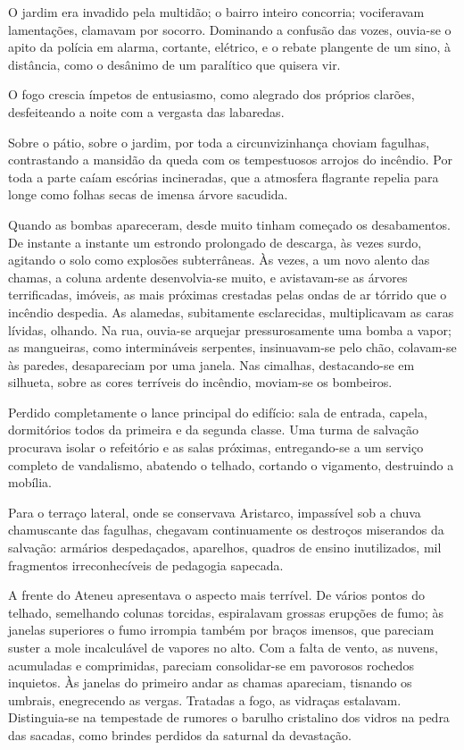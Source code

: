 O jardim era invadido pela multidão; o bairro inteiro concorria;
vociferavam lamentações, clamavam por socorro. Dominando a confusão das
vozes, ouvia{}-se o apito da polícia em alarma, cortante, elétrico, e o
rebate plangente de um sino, à distância, como o desânimo de um
paralítico que quisera vir. 

O fogo crescia ímpetos de entusiasmo, como
alegrado dos próprios clarões, desfeiteando a noite com a vergasta das
labaredas. 

Sobre o pátio, sobre o jardim, por toda a circunvizinhança
choviam fagulhas, contrastando a mansidão da queda com os tempestuosos
arrojos do incêndio. Por toda a parte caíam escórias incineradas, que a
atmosfera flagrante repelia para longe como folhas secas de imensa
árvore sacudida. 

Quando as bombas apareceram, desde muito tinham
começado os desabamentos. De instante a instante um estrondo prolongado
de descarga, às vezes surdo, agitando o solo como explosões
subterrâneas. Às vezes, a um novo alento das chamas, a coluna ardente
desenvolvia{}-se muito, e avistavam{}-se as árvores terrificadas,
imóveis, as mais próximas crestadas pelas ondas de ar tórrido que o
incêndio despedia. As alamedas, subitamente esclarecidas, multiplicavam
as caras lívidas, olhando. Na rua, ouvia{}-se arquejar pressurosamente
uma bomba a vapor; as mangueiras, como intermináveis serpentes,
insinuavam{}-se pelo chão, colavam{}-se às paredes, desapareciam por
uma janela. Nas cimalhas, destacando{}-se em silhueta, sobre as cores
terríveis do incêndio, moviam{}-se os bombeiros. 

Perdido completamente o lance principal do edifício: sala de 
entrada, capela, dormitórios
todos da primeira e da segunda classe. Uma turma de salvação procurava
isolar o refeitório e as salas próximas, entregando{}-se a um serviço
completo de vandalismo, abatendo o telhado, cortando o vigamento,
destruindo a mobília. 

Para o terraço lateral, onde se conservava
Aristarco, impassível sob a chuva chamuscante das fagulhas, chegavam
continuamente os destroços miserandos da salvação: armários
despedaçados, aparelhos, quadros de ensino inutilizados, mil fragmentos
irreconhecíveis de pedagogia sapecada. 

A frente do Ateneu apresentava o
aspecto mais terrível. De vários pontos do telhado, semelhando colunas
torcidas, espiralavam grossas erupções de fumo; às janelas superiores o
fumo irrompia também por braços imensos, que pareciam suster a mole
incalculável de vapores no alto. Com a falta de vento, as nuvens,
acumuladas e comprimidas, pareciam consolidar{}-se em pavorosos
rochedos inquietos. Às janelas do primeiro andar as chamas apareciam,
tisnando os umbrais, enegrecendo as vergas. Tratadas a fogo, as
vidraças estalavam. Distinguia{}-se na tempestade de rumores o barulho
cristalino dos vidros na pedra das sacadas, como brindes perdidos da
saturnal da devastação. 

